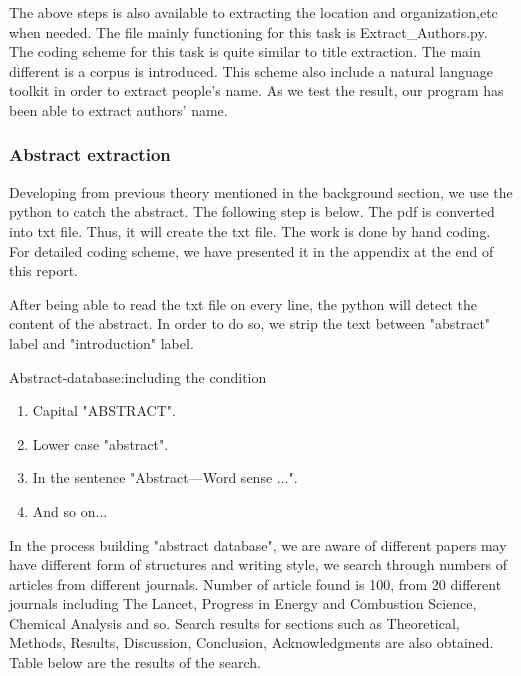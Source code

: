 The above steps is also available to extracting the location and organization,etc when needed. 
The file mainly functioning for this task is Extract_Authors.py.
The coding scheme for this task is quite similar to title extraction.
The main different is a corpus is introduced.
This scheme also include a natural language toolkit in order to extract people's name. 
As we test the result, our program has been able to extract authors' name.

\subsubsection{Abstract extraction}

	Developing from previous theory mentioned in the background section, we use the python to catch the abstract.
	The following step is below.
	The pdf is converted into txt file.
	Thus, it will create the txt file.
	The work is done by hand coding.
	For detailed coding scheme, we have presented it in the appendix at the end of this report.
	 
	After being able to read the txt file on every line, the python will detect the content of the abstract.
	In order to do so, we strip the text between "abstract" label and "introduction" label.	
	
	Abstract-database:including the condition
	
	\begin{enumerate}
		
		\item Capital         "ABSTRACT".
		\item Lower case      "abstract".
		\item In the sentence "Abstract—Word sense ...".
		\item And so on...
		
	\end{enumerate}
	
	In the process building "abstract database", we are aware of different papers may have different form of structures and writing style, we search through numbers of articles from different journals.
	Number of article found is 100, from 20 different journals including The Lancet, Progress in Energy and Combustion Science, Chemical Analysis and so.
	Search results for sections such as Theoretical, Methods, Results, Discussion, Conclusion, Acknowledgments are also obtained.
	Table below are the results of the search.
	
